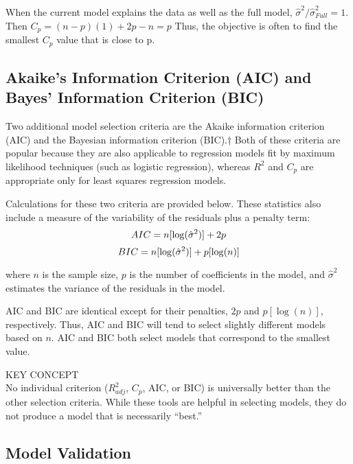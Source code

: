 \documentclass[
]{report}
\begin{document}
When the current model explains the data as well as the full model, \(\hat{\sigma}^2 / \hat{\sigma}^2_{Full} = 1\). Then \(C_p = (n - p)(1) + 2p - n = p\) Thus, the objective is often to find the smallest \(C_p\) value that is close to p.

\subsection{Akaike's Information Criterion (AIC) and Bayes' Information Criterion (BIC)}\label{akaikes-information-criterion-aic-and-bayes-information-criterion-bic}

Two additional model selection criteria are the Akaike information criterion (AIC) and the Bayesian information criterion (BIC).† Both of these criteria are popular because they are also applicable to regression models fit by maximum likelihood techniques (such as logistic regression), whereas \(R^2\) and \(C_p\) are appropriate only for least squares regression models.

Calculations for these two criteria are provided below. These statistics also include a measure of the variability of the residuals plus a penalty term:
\begin{equation}
AIC = n[\log(\hat{\sigma}^2)] + 2p \notag
\end{equation}
\begin{equation}
BIC = n[\log(\hat{\sigma}^2)] + p[\log(n)] \notag
\end{equation}

where \(n\) is the sample size, \(p\) is the number of coefficients in the model, and \(\hat{\sigma}^2\) estimates the variance of the residuals in the model.

AIC and BIC are identical except for their penalties, \(2p\) and \(p[\log(n)]\), respectively. Thus, AIC and BIC will tend to select slightly different models based on \(n\). AIC and BIC both select models that correspond to the smallest value.

KEY CONCEPT\\
No individual criterion (\(R^2_{adj}\), \(C_p\), AIC, or BIC) is universally better than the other selection criteria. While these tools are helpful in selecting models, they do not produce a model that is necessarily ``best.''

\subsection{Model Validation}\label{model-validation}
\end{document}
